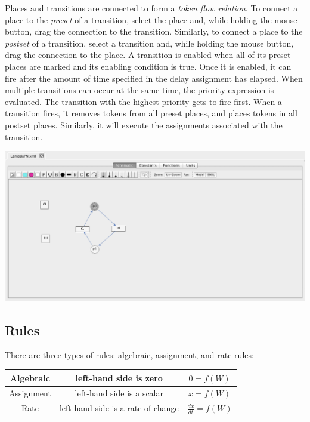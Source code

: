 \documentclass[titlepage,11pt]{article}
\begin{document}
Places and transitions are connected to form a \emph{token flow relation}.  To connect a place to the \emph{preset} of a transition, select the place and, while holding the mouse button, drag the connection to the transition.  Similarly, to connect a place to the \emph{postset} of a transition, select a transition and, while holding the mouse button, drag the connection to the place.  A transition is enabled when all of its preset places are marked and its enabling condition is true. Once it is enabled, it can fire after the amount of time specified in the delay assignment has elapsed.  When multiple transitions can occur at the same time, the priority expression is evaluated.  The transition with the highest priority gets to fire first.  When a transition fires, it removes tokens from all preset places, and places tokens in all postset places.  Similarly, it will execute the assignments associated with the transition.

\begin{center}
\includegraphics[width=160mm]{screenshots/flowRelation}
\end{center}

\clearpage

\subsection{\label{Rules}Rules}

\noindent
There are three types of rules: algebraic, assignment, and rate rules:
\begin{center}
\begin{tabular}{|c|c|c|}
\hline
Algebraic  & left-hand side is zero             & $0 = f(W)$ \\ \hline
Assignment & left-hand side is a scalar         & $x = f(W)$ \\ \hline
Rate       & left-hand side is a rate-of-change & $\frac{dx}{dt} = f(W)$ 
\\ \hline
\end{tabular}
\end{center}
\end{document}
